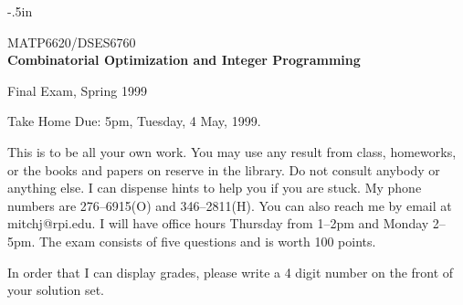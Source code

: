 

\oddsidemargin -.5in
\textwidth 7in
\textheight 9.5in
\topmargin -30pt
\headsep 0in
\headheight 0in

\newcommand{\til}{\char '176}



\begin{center}
  \begin{large}
     MATP6620/DSES6760 \\
 {\bf Combinatorial Optimization and Integer Programming}
  \end{large}
\end{center}
\begin{center}
  \begin{large}
                Final Exam, Spring 1999
  \end{large}
\end{center}

Take Home   \hfill    Due: 5pm, Tuesday, 4 May, 1999.

\vspace{\baselineskip}

This is to be all your own work.  You may use any result from class,
homeworks, or the books and papers on reserve in the library.
Do not consult anybody or anything else. 
I can dispense hints to help you if you are stuck.
My phone numbers are 276--6915(O) and 346--2811(H).
You can also reach me by email at mitchj@rpi.edu.
I will have office hours Thursday from 1--2pm
and Monday 2--5pm.
The exam consists of five questions and is worth 100 points.

In order that I can display grades, please write a 4 digit number
on the front of your solution set.

\vspace{\baselineskip}

